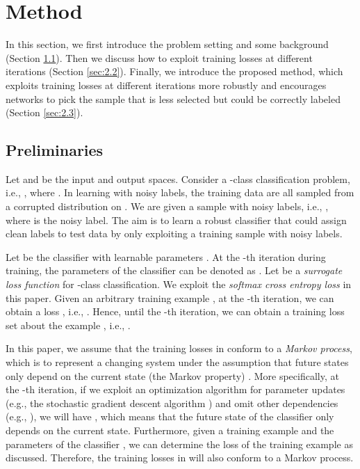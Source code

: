 \documentclass[11pt]{article}
\begin{document}
\section{Method}\label{sec:2}
In this section, we first introduce the problem setting and some background (Section \ref{sec:2.1}). Then we discuss how to exploit training losses at different iterations (Section \ref{sec:2.2}). Finally, we introduce the proposed method, which exploits training losses at different iterations more robustly and encourages networks to pick the sample that is less selected but could be correctly labeled (Section \ref{sec:2.3}). 
\vspace{-5pt}
\subsection{Preliminaries}\label{sec:2.1}
Let  and  be the input and output spaces. Consider a -class classification problem, i.e., , where . In learning with noisy labels, the training data are all sampled from a corrupted distribution on . We are given a sample with noisy labels, i.e., , where  is the noisy label. The aim is to learn a robust classifier that could assign clean labels to test data by only exploiting a training sample with noisy labels.

Let  be the classifier with learnable parameters . At the -th iteration during training, the parameters of the classifier  can be denoted as . Let  be a \textit{surrogate loss function} for -class classification. We exploit the \textit{softmax cross entropy loss} in this paper. Given an arbitrary training example , at the -th iteration, we can obtain a loss , i.e., . Hence, until the -th iteration, we can obtain a training loss set  about the example , i.e., .

In this paper, we assume that the training losses in  conform to a \textit{Markov process}, which is to represent a changing system under the assumption that future states only depend on the current state (the Markov property) \citep{rosenthal1997faithful}. More specifically, at the -th iteration, if we exploit an optimization algorithm for parameter updates (e.g., the stochastic gradient descent algorithm \citep{bottou2012stochastic}) and omit other dependencies (e.g., ), we will have , which means that the future state of the classifier  only depends on the current state. Furthermore, given a training example and the parameters of the classifier , we can determine the loss of the training example as discussed. Therefore, the training losses in  will also conform to a Markov process.
\end{document}
